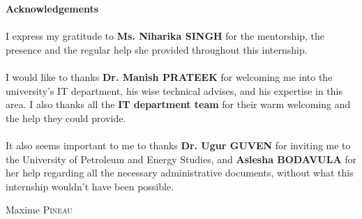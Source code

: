 


\begin{center}
	\LARGE{\textbf{Acknowledgements}}\\[1cm]
\end{center}


\large{ \paragraph{} 
I express my gratitude to \textbf{Ms. Niharika SINGH} for the mentorship, the  presence and the regular help she provided throughout this internship.
}


\large{ \paragraph{} 
I would like to thanks \textbf{Dr. Manish PRATEEK} for welcoming me into the university's IT department, his wise technical advises, and his expertise in this area. I also thanks all the \textbf{IT department team} for their warm welcoming and the help they could provide. 
}


\large{ \paragraph{} 
It also seems important to me to thanks \textbf{Dr. Ugur GUVEN} for inviting me to the University of Petroleum and Energy Studies, and \textbf{Aslesha BODAVULA} for her help regarding all the necessary administrative documents, without what this internship wouldn't have been possible.  
}



\begin{flushright} 
	Maxime \textsc{Pineau}\\
\end{flushright}


\newpage
